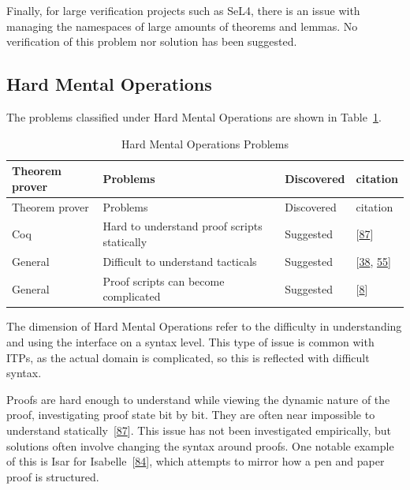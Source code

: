 \documentclass[
]{article}
\begin{document}
Finally, for large verification projects such as SeL4, there is an issue
with managing the namespaces of large amounts of theorems and lemmas. No
verification of this problem nor solution has been suggested.

\hypertarget{hard-mental-operations}{%
\subsection{Hard Mental Operations}\label{hard-mental-operations}}

The problems classified under Hard Mental Operations are shown in
Table~\ref{tbl:hard_mental_operations}.

\hypertarget{tbl:hard_mental_operations}{}
\begin{longtable}[]{@{}llll@{}}
\caption{\label{tbl:hard_mental_operations}Hard Mental Operations
Problems}\tabularnewline
\toprule
Theorem prover & Problems & Discovered & citation \\
\midrule
\endfirsthead
\toprule
Theorem prover & Problems & Discovered & citation \\
\midrule
\endhead
Coq & Hard to understand proof scripts statically & Suggested &
{[}\protect\hyperlink{ref-zacchiroli_user_2007}{87}{]} \\
General & Difficult to understand tacticals & Suggested &
{[}\protect\hyperlink{ref-grov_tinker_2018}{38},
\protect\hyperlink{ref-lin_understanding_2016}{55}{]} \\
General & Proof scripts can become complicated & Suggested &
{[}\protect\hyperlink{ref-aspinall_towards_2016}{8}{]} \\
\bottomrule
\end{longtable}

The dimension of Hard Mental Operations refer to the difficulty in
understanding and using the interface on a syntax level. This type of
issue is common with ITPs, as the actual domain is complicated, so this
is reflected with difficult syntax.

Proofs are hard enough to understand while viewing the dynamic nature of
the proof, investigating proof state bit by bit. They are often near
impossible to understand
statically~{[}\protect\hyperlink{ref-zacchiroli_user_2007}{87}{]}. This
issue has not been investigated empirically, but solutions often involve
changing the syntax around proofs. One notable example of this is Isar
for Isabelle~{[}\protect\hyperlink{ref-wenzel_structured_2006}{84}{]},
which attempts to mirror how a pen and paper proof is structured.
\end{document}
